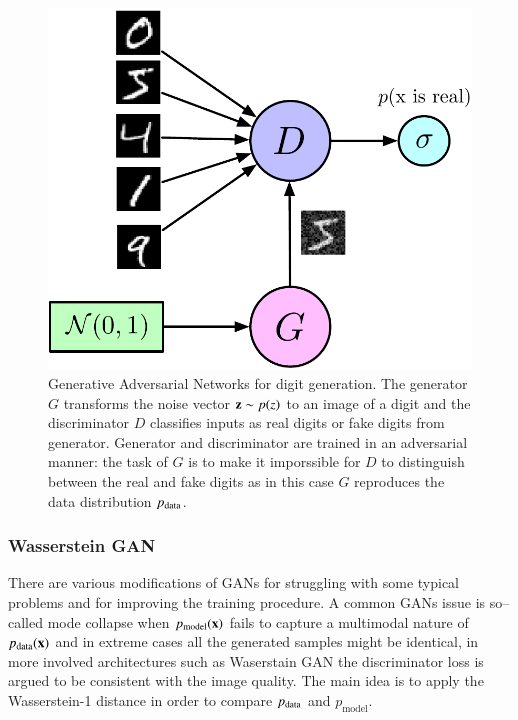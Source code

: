 \begin{figure}
\centering
\includegraphics[width=0.3\linewidth]{figures/gan_pic.pdf}
\caption{Generative Adversarial Networks for digit generation. The generator $G$ transforms the noise vector $\mathbf{z} \sim p(z)$ to an image of a digit and the discriminator $D$ classifies inputs as real digits or fake digits from generator. Generator and discriminator are trained in an adversarial manner: the task of $G$ is to make it imporssible for $D$ to distinguish between the real and fake digits as in this case $G$ reproduces the data distribution $p_{\text{data}}$.}
\label{fig:GANs}
\end{figure}



\subsubsection{Wasserstein GAN}
There are various modifications of GANs for struggling with some typical problems and for improving the training procedure. A common GANs issue is so--called mode collapse when $p_\text{model} (\mathbf{x})$ fails to capture a multimodal nature of $p_{\text{data}}(\mathbf{x})$ and in extreme cases all the generated samples might be identical, in more involved architectures such as Waserstain GAN \cite{arjovsky2017wasserstein} the discriminator loss is argued to be consistent with the image quality. The main idea is to apply the Wasserstein-1 distance in order to compare $p_{\text{data}}$ and $p_{\text{model}}$.


